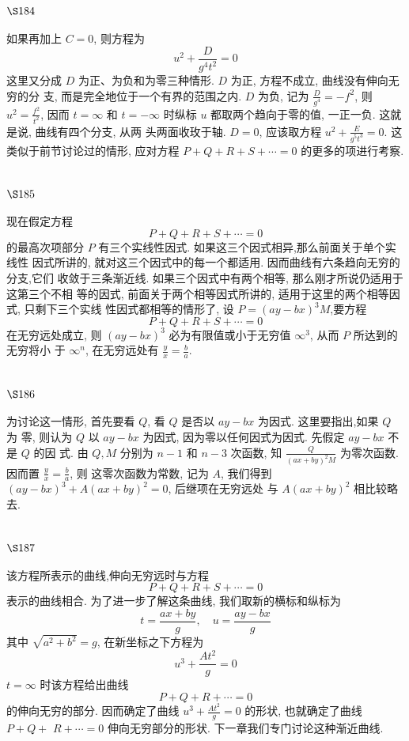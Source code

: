 \section{$\S 184$}

如果再加上 $C=0$, 则方程为
\[
u^{2}+\frac{D}{g^{4} t^{2}}=0
\]
这里又分成 $D$ 为正、为负和为零三种情形. $D$ 为正, 方程不成立, 曲线没有伸向无穷的分 支, 而是完全地位于一个有界的范围之内. $D$ 为负, 记为 $\frac{D}{g^{4}}=-f^{2}$, 则 $u^{2}=\frac{f^{2}}{t^{2}}$, 因而 $t=\infty$ 和 $t=-\infty$ 时纵标 $u$ 都取两个趋向于零的值, 一正一负. 这就是说, 曲线有四个分支, 从两 头两面收玫于轴. $D=0$, 应该取方程 $u^{2}+\frac{E}{g^{5} t^{3}}=0$. 这类似于前节讨论过的情形, 应对方程 $P+Q+R+S+\cdots=0$ 的更多的项进行考察. 

\section{$\S 185$}
现在假定方程
\[
P+Q+R+S+\cdots=0
\]
的最高次项部分 $P$ 有三个实线性因式. 如果这三个因式相异,那么前面关于单个实线性 因式所讲的, 就对这三个因式中的每一个都适用. 因而曲线有六条趋向无穷的分支,它们 收敛于三条渐近线. 如果三个因式中有两个相等, 那么刚才所说仍适用于这第三个不相 等的因式, 前面关于两个相等因式所讲的, 适用于这里的两个相等因式, 只剩下三个实线 性因式都相等的情形了, 设 $P=(a y-b x)^{3} M$,要方程
\[
P+Q+R+S+\cdots=0
\]
在无穷远处成立, 则 $(a y-b x)^{3}$ 必为有限值或小于无穷值 $\infty^{3}$, 从而 $P$ 所达到的无穷将小 于 $\infty^{n}$, 在无穷远处有 $\frac{y}{x}=\frac{b}{a}$.

\section{$\S 186$}

为讨论这一情形, 首先要看 $Q$, 看 $Q$ 是否以 $a y-b x$ 为因式. 这里要指出,如果 $Q$ 为 零, 则认为 $Q$ 以 $a y-b x$ 为因式, 因为零以任何因式为因式. 先假定 $a y-b x$ 不是 $Q$ 的因 式. 由 $Q, M$ 分别为 $n-1$ 和 $n-3$ 次函数, 知 $\frac{Q}{(a x+b y)^{2} M}$ 为零次函数. 因而置 $\frac{y}{x}=\frac{b}{a}$, 则 这零次函数为常数, 记为 $A$, 我们得到 $(a y-b x)^{3}+A(a x+b y)^{2}=0$, 后继项在无穷远处 与 $A(a x+b y)^{2}$ 相比较略去.

\section{$\S 187$}

该方程所表示的曲线,伸向无穷远时与方程
\[
P+Q+R+S+\cdots=0
\]
表示的曲线相合. 为了进一步了解这条曲线, 我们取新的横标和纵标为
\[
t=\frac{a x+b y}{g}, \quad u=\frac{a y-b x}{g}
\]
其中 $\sqrt{a^{2}+b^{2}}=g$, 在新坐标之下方程为
\[
u^{3}+\frac{A t^{2}}{g}=0
\]
$t=\infty$ 时该方程给出曲线
\[
P+Q+R+\cdots=0
\]
的伸向无穷的部分. 因而确定了曲线 $u^{3}+\frac{A t^{2}}{g}=0$ 的形状, 也就确定了曲线 $P+Q+$ $R+\cdots=0$ 伸向无穷部分的形状. 下一章我们专门讨论这种渐近曲线.


